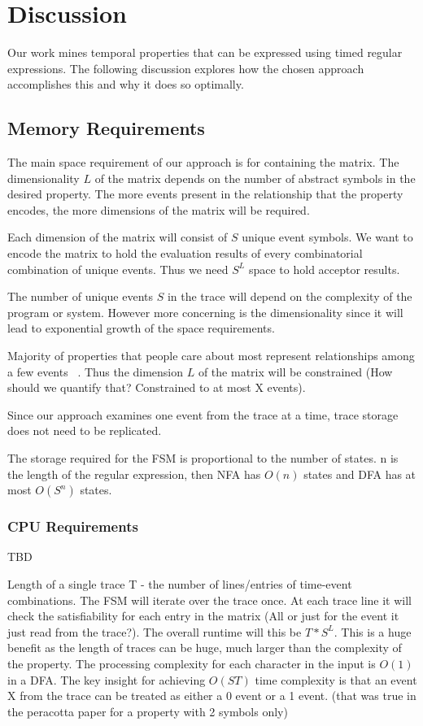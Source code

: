 \documentclass[]{sigplanconf}
\begin{document}
\section{Discussion}

Our work mines temporal properties that can be expressed using timed regular expressions. The following discussion explores how the chosen approach accomplishes this and why it does so optimally.


\subsection{Memory Requirements}

The main space requirement of our approach is for containing the matrix. The dimensionality $L$ of the matrix depends on the number of abstract symbols in the desired property. The more events present in the relationship that the property encodes, the more dimensions of the matrix will be required.

Each dimension of the matrix will consist of $S$ unique event symbols. We want to encode the matrix to hold the evaluation results of every combinatorial combination of unique events. Thus we need $S^L$ space to hold acceptor results.

The number of unique events $S$ in the trace will depend on the complexity of the program or system. However more concerning is the dimensionality since it will lead to exponential growth of the space requirements.

Majority of properties that people care about most represent relationships among a few events ~\cite{evans1, dwyer}. Thus the dimension $L$ of the matrix will be constrained (How should we quantify that? Constrained to at most X events).

Since our approach examines one event from the trace at a time, trace storage does not need to be replicated.

The storage required for the FSM is proportional to the number of states. n is the length of the regular expression, then NFA has $O(n)$ states and DFA has at most $O(S^n)$ states.

\subsubsection{CPU Requirements}

TBD

Length of a single trace T - the number of lines/entries of time-event combinations.
The FSM will iterate over the trace once. At each trace line it will check the satisfiability for each entry in the matrix (All or just for the event it just read from the trace?). The overall runtime will this be $T * S^L$.
This is a huge benefit as the length of traces can be huge, much larger than the complexity of the property.
The processing complexity for each character in the input is $O(1)$ in a DFA.
The key insight for achieving $O(ST)$ time complexity is that an event X from the trace can be treated as either a 0 event or a 1 event. (that was true in the peracotta paper for a property with 2 symbols only)
\end{document}
